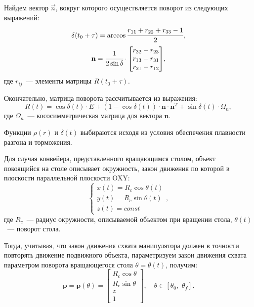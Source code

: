 Найдем вектор $ \overrightarrow{n} $, вокруг которого осуществляется поворот из следующих выражений:
\begin{equation}
	\delta(t_0 + \tau) = \arccos{\cfrac{r_{11} + r_{22} + r_{33} - 1}{2}},
\end{equation}
\begin{equation}
	\mathbf{n} = \cfrac{1}{2 \sin{\delta}} 
	\cdot
	\begin{bmatrix}
		r_{32} - r_{23} \\
		r_{13} - r_{31} \\
		r_{21} - r_{12}
	\end{bmatrix}\!,
\end{equation}
где $ r_{ij} $~--- элементы матрицы $ R(t_0 + \tau) $.

Окончательно, матрица поворота рассчитывается из выражения:
\begin{equation}\label{Rt}
	R(t) = \cos \delta(t) \cdot E + (1 - \cos \delta(t)) \cdot \mathbf{n} \cdot \mathbf{n}^T + \sin \delta(t) \cdot \Omega_n,
\end{equation}
где $ \Omega_n $~--- кососимметрическая матрица для вектора $ \mathbf{n} $.

Функции $ \rho(r) $ и $ \delta(t) $ выбираются исходя из условия обеспечения плавности разгона и торможения.

Для случая конвейера, представленного вращающимся столом, объект покоящийся на столе описывает окружность, закон движения по которой в плоскости параллельной плоскости OXY:
\begin{equation}
	\begin{cases}
		x(t) = R_c \cos{\theta(t)}\\
		y(t) = R_c \sin{\theta(t)} \\
		z(t) = const
	\end{cases}\!\!\!\!\!\!\!\!,
\end{equation}
где $ R_c $~--- радиус окружности, описываемой объектом при вращении стола, $ \theta(t) $~--- поворот стола.

Тогда, учитывая, что закон движения схвата манипулятора должен в точности повторять движение подвижного объекта, параметризуем закон движения схвата параметром поворота вращающегося стола $\theta = \theta(t)$, получим:
\begin{equation}
	\mathbf{p} = \mathbf{p}(\theta) = 
	\begin{bmatrix}
		R_c \cos{\theta}\\
		R_c \sin{\theta} \\
		z \\
		1
	\end{bmatrix}\!\!,
	\quad
	\theta \in [\theta_0,\,\,\theta_f].
\end{equation}

